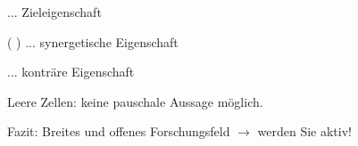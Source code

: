 \documentclass[a4paper]{article}
\newcommand{\cmark}{\ding{51}}
\newcommand{\xmark}{\ding{55}}
\begin{document}
\begin{multicols}{3}
    \begin{itemize*}
        \item[\cmark] ... Zieleigenschaft
        \item ( \cmark ) ... synergetische Eigenschaft
        \item[\xmark] ... konträre Eigenschaft
        \item Leere Zellen: keine pauschale Aussage möglich.
    \end{itemize*}

    Fazit: Breites und offenes Forschungsfeld $\rightarrow$
    werden Sie aktiv!

\end{multicols}
\end{document}
